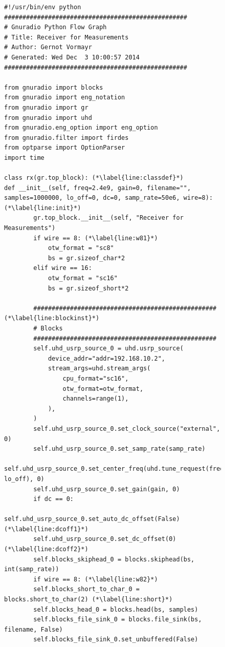 \documentclass[12pt,a4paper,parskip=full,abstracton]{scrartcl}
\begin{document}
\begin{figure}[htbp]
    \centering
    \begin{lstlisting}[basicstyle=\tiny,caption={Generated RX flowgraph module with modifications ({\ttfamily rx\_final.py)}},label=lst:rxfinal.py]
#!/usr/bin/env python
##################################################
# Gnuradio Python Flow Graph
# Title: Receiver for Measurements
# Author: Gernot Vormayr
# Generated: Wed Dec  3 10:00:57 2014
##################################################

from gnuradio import blocks
from gnuradio import eng_notation
from gnuradio import gr
from gnuradio import uhd
from gnuradio.eng_option import eng_option
from gnuradio.filter import firdes
from optparse import OptionParser
import time

class rx(gr.top_block): (*\label{line:classdef}*)
def __init__(self, freq=2.4e9, gain=0, filename="", samples=1000000, lo_off=0, dc=0, samp_rate=50e6, wire=8): (*\label{line:init}*)
        gr.top_block.__init__(self, "Receiver for Measurements")
        if wire == 8: (*\label{line:w81}*)
            otw_format = "sc8"
            bs = gr.sizeof_char*2
        elif wire == 16:
            otw_format = "sc16"
            bs = gr.sizeof_short*2

        ################################################## (*\label{line:blockinst}*)
        # Blocks
        ##################################################
        self.uhd_usrp_source_0 = uhd.usrp_source(
        	device_addr="addr=192.168.10.2",
        	stream_args=uhd.stream_args(
        		cpu_format="sc16",
        		otw_format=otw_format,
        		channels=range(1),
        	),
        )
        self.uhd_usrp_source_0.set_clock_source("external", 0)
        self.uhd_usrp_source_0.set_samp_rate(samp_rate)
        self.uhd_usrp_source_0.set_center_freq(uhd.tune_request(freq, lo_off), 0)
        self.uhd_usrp_source_0.set_gain(gain, 0)
        if dc == 0:
            self.uhd_usrp_source_0.set_auto_dc_offset(False) (*\label{line:dcoff1}*)
	    self.uhd_usrp_source_0.set_dc_offset(0)          (*\label{line:dcoff2}*)
        self.blocks_skiphead_0 = blocks.skiphead(bs, int(samp_rate))
        if wire == 8: (*\label{line:w82}*)
        self.blocks_short_to_char_0 = blocks.short_to_char(2) (*\label{line:short}*)
        self.blocks_head_0 = blocks.head(bs, samples)
        self.blocks_file_sink_0 = blocks.file_sink(bs, filename, False)
        self.blocks_file_sink_0.set_unbuffered(False)


\end{lstlisting}
\end{figure}
\end{document}

